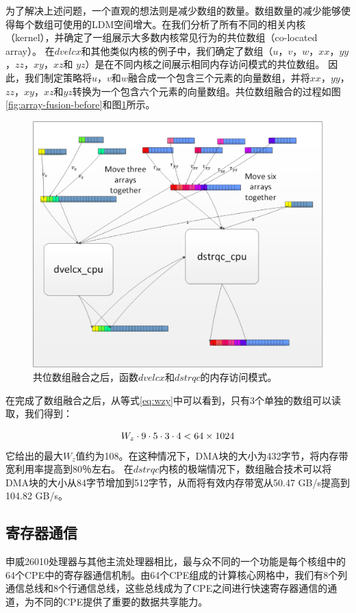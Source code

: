 \documentclass[degree=doctor]{thuthesis}
\begin{document}
为了解决上述问题，一个直观的想法则是减少数组的数量。数组数量的减少能够使得每个数组可使用的LDM空间增大。在我们分析了所有不同的相关内核（kernel），并确定了一组展示大多数内核常见行为的共位数组（co-located array）。 在$ dvelcx $和其他类似内核的例子中，我们确定了数组（$ u $，$ v $，$ w $，$ xx $，$ yy $，$ zz $，$ xy $，$ xz $和 $ yz $）是在不同内核之间展示相同内存访问模式的共位数组。 因此，我们制定策略将$ u $，$ v $和$ w $融合成一个包含三个元素的向量数组，并将$ xx $，$ yy $，$ zz $，$ xy $，$ xz $和$ yz $转换为一个包含六个元素的向量数组。共位数组融合的过程如图\ref{fig:array-fusion-before}和图\ref{fig:array-fusion-after}所示。

\begin{figure}[ht]
\centering
\includegraphics[width=0.7\columnwidth]{awp_after.png}
\caption{共位数组融合之后，函数$dvelcx$和$dstrqc$的内存访问模式。}
\label{fig:array-fusion-after}
\end{figure}

在完成了数组融合之后，从等式\ref{eq:wzy}中可以看到，只有3个单独的数组可以读取，我们得到：

\begin{equation}
W_z \cdot 9 \cdot 5 \cdot 3 \cdot 4 < 64 \times 1024\\
\label{eq:wzy2}
\end{equation}
它给出的最大$ W_z $值约为108。在这种情况下，DMA块的大小为432字节，将内存带宽利用率提高到80％左右。 在$ dstrqc $内核的极端情况下，数组融合技术可以将DMA块的大小从84字节增加到512字节，从而将有效内存带宽从50.47 GB/s提高到104.82 GB/s。

\subsection{寄存器通信}

申威26010处理器与其他主流处理器相比，最与众不同的一个功能是每个核组中的64个CPE中的寄存器通信机制。由64个CPE组成的计算核心网格中，我们有8个列通信总线和8个行通信总线，这些总线成为了CPE之间进行快速寄存器通信的通道，为不同的CPE提供了重要的数据共享能力。
\end{document}

